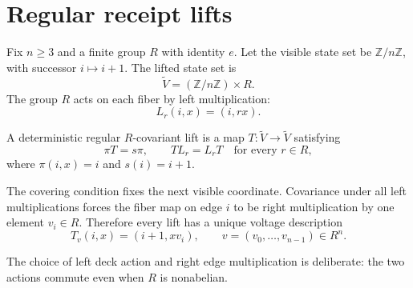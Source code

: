 \section{Regular receipt lifts}

Fix $n\geq3$ and a finite group $R$ with identity $e$. Let the visible state
set be $\mathbb Z/n\mathbb Z$, with successor $i\mapsto i+1$. The lifted state
set is
\[
\widetilde V=(\mathbb Z/n\mathbb Z)\times R.
\]
The group $R$ acts on each fiber by left multiplication:
\[
L_r(i,x)=(i,rx).
\]

\begin{definition}
A deterministic regular $R$-covariant lift is a map
$T:\widetilde V\to\widetilde V$ satisfying
\[
\pi T=s\pi,
\qquad
TL_r=L_rT
\quad\text{for every }r\in R,
\]
where $\pi(i,x)=i$ and $s(i)=i+1$.
\end{definition}

The covering condition fixes the next visible coordinate. Covariance under
all left multiplications forces the fiber map on edge $i$ to be right
multiplication by one element $v_i\in R$. Therefore every lift has a unique
voltage description
\[
T_v(i,x)=(i+1,xv_i),
\qquad
v=(v_0,\ldots,v_{n-1})\in R^n.
\]

The choice of left deck action and right edge multiplication is deliberate:
the two actions commute even when $R$ is nonabelian.

